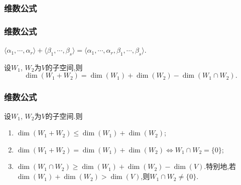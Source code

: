 \subsubsection{维数公式}
\begin{frame}\frametitle{维数公式}
\begin{lemma}
$\langle\alpha_1,\cdots,\alpha_r\rangle + \langle\beta_1,\cdots,\beta_s\rangle = \langle\alpha_1,\cdots,\alpha_r,\beta_1,\cdots,\beta_s\rangle$.
\end{lemma}
\pp
\begin{theorem}[维数公式]设$W_1$, $W_2$为$V$的子空间,则
\[\dim(W_1+W_2) = \dim(W_1) + \dim(W_2) - \dim(W_1\cap W_2).\]
\end{theorem}
\pp
{}
\end{frame}






\begin{frame}\frametitle{维数公式}

\begin{corollary}
设$W_1$, $W_2$为$V$的子空间.\pp 则
\begin{enumerate}
\item $\dim(W_1+W_2) \leq \dim(W_1) + \dim(W_2)$;\pp
\item $\dim(W_1+W_2) = \dim(W_1) + \dim(W_2)\Leftrightarrow W_1\cap W_2 = \{0\}$;\pp
\item $\dim(W_1\cap W_2) \geq \dim(W_1) + \dim(W_2) - \dim(V)$.\pp 特别地,若 $\dim(W_1) + \dim(W_2) > \dim(V)$,则$W_1\cap W_2\neq\{0\}$.
\end{enumerate}
\end{corollary}
\end{frame}




